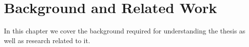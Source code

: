 \chapter{Background and Related Work}\label{chapter:background}

In this chapter we cover the background required for understanding the thesis as well as research related to it.